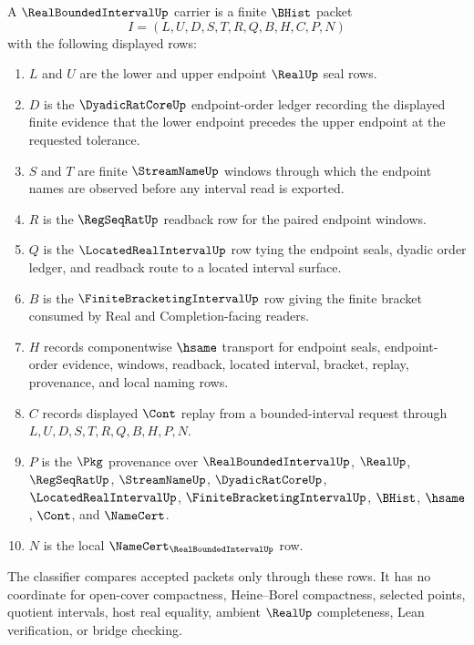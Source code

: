 \begin{definition}
\label{def:real-bounded-interval-carrier}
A $\RealBoundedIntervalUp$ carrier is a finite $\BHist$ packet
$$
I=(L,U,D,S,T,R,Q,B,H,C,P,N)
$$
with the following displayed rows:
\begin{enumerate}
\item $L$ and $U$ are the lower and upper endpoint $\RealUp$ seal rows.
\item $D$ is the $\DyadicRatCoreUp$ endpoint-order ledger recording the displayed finite evidence that the lower endpoint precedes the upper endpoint at the requested tolerance.
\item $S$ and $T$ are finite $\StreamNameUp$ windows through which the endpoint names are observed before any interval read is exported.
\item $R$ is the $\RegSeqRatUp$ readback row for the paired endpoint windows.
\item $Q$ is the $\LocatedRealIntervalUp$ row tying the endpoint seals, dyadic order ledger, and readback route to a located interval surface.
\item $B$ is the $\FiniteBracketingIntervalUp$ row giving the finite bracket consumed by Real and Completion-facing readers.
\item $H$ records componentwise $\hsame$ transport for endpoint seals, endpoint-order evidence, windows, readback, located interval, bracket, replay, provenance, and local naming rows.
\item $C$ records displayed $\Cont$ replay from a bounded-interval request through $L,U,D,S,T,R,Q,B,H,P,N$.
\item $P$ is the $\Pkg$ provenance over $\RealBoundedIntervalUp$, $\RealUp$, $\RegSeqRatUp$, $\StreamNameUp$, $\DyadicRatCoreUp$, $\LocatedRealIntervalUp$, $\FiniteBracketingIntervalUp$, $\BHist$, $\hsame$, $\Cont$, and $\NameCert$.
\item $N$ is the local $\NameCert_{\RealBoundedIntervalUp}$ row.
\end{enumerate}
The classifier compares accepted packets only through these rows. It has no coordinate for open-cover compactness, Heine--Borel compactness, selected points, quotient intervals, host real equality, ambient $\RealUp$ completeness, Lean verification, or bridge checking.
\end{definition}

